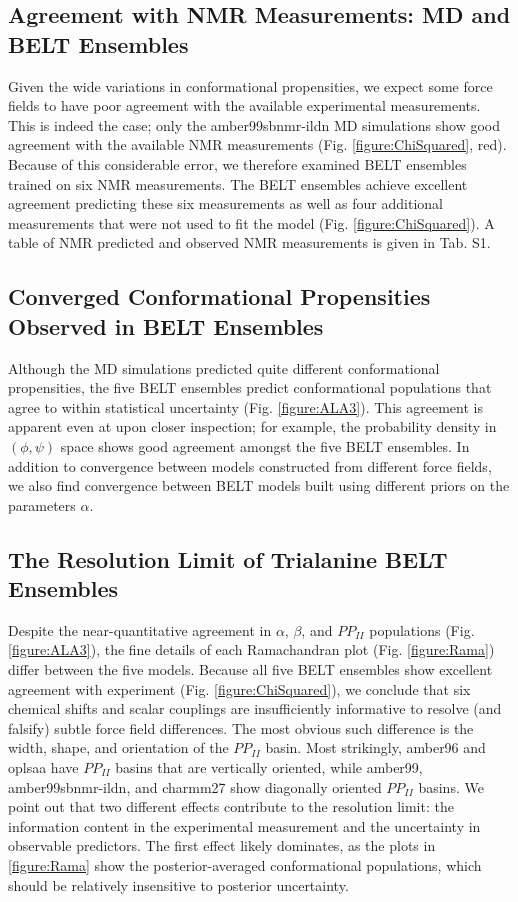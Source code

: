 \documentclass[11pt,titlepage]{article}
\begin{document}
\subsection*{Agreement with NMR Measurements: MD and BELT Ensembles}

Given the wide variations in conformational propensities, we expect some force fields to have poor agreement with the available experimental measurements.  This is indeed the case; only the amber99sbnmr-ildn MD simulations show good agreement with the available NMR measurements (Fig. \ref{figure:ChiSquared}, red).  Because of this considerable error, we therefore examined BELT ensembles trained on six NMR measurements.  The BELT ensembles achieve excellent agreement predicting these six measurements as well as four additional measurements that were not used to fit the model (Fig. \ref{figure:ChiSquared}).  A table of NMR predicted and observed NMR measurements is given in Tab. S1.  

\subsection*{Converged Conformational Propensities Observed in BELT Ensembles}

Although the MD simulations predicted quite different conformational propensities, the five BELT ensembles predict conformational populations that agree to within statistical uncertainty (Fig. \ref{figure:ALA3}).  This agreement is apparent even at upon closer inspection; for example, the probability density in $(\phi, \psi)$ space shows good agreement amongst the five BELT ensembles.  In addition to convergence between models constructed from different force fields, we also find convergence between BELT models built using different priors on the parameters $\alpha$.  

\subsection*{The Resolution Limit of Trialanine BELT Ensembles}

Despite the near-quantitative agreement in $\alpha$, $\beta$, and $PP_{II}$ populations (Fig. \ref{figure:ALA3}), the fine details of each Ramachandran plot (Fig. \ref{figure:Rama}) differ between the five models.  Because all five BELT ensembles show excellent agreement with experiment (Fig. \ref{figure:ChiSquared}), we conclude that six chemical shifts and scalar couplings are insufficiently informative to resolve (and falsify) subtle force field differences.  The most obvious such difference is the width, shape, and orientation of the $PP_{II}$ basin.  Most strikingly, amber96 and oplsaa have $PP_{II}$ basins that are vertically oriented, while amber99, amber99sbnmr-ildn, and charmm27 show diagonally oriented $PP_{II}$ basins.  We point out that two different effects contribute to the resolution limit: the information content in the experimental measurement and the uncertainty in observable predictors.  The first effect likely dominates, as the plots in \ref{figure:Rama} show the posterior-averaged conformational populations, which should be relatively insensitive to posterior uncertainty.  
\end{document}
